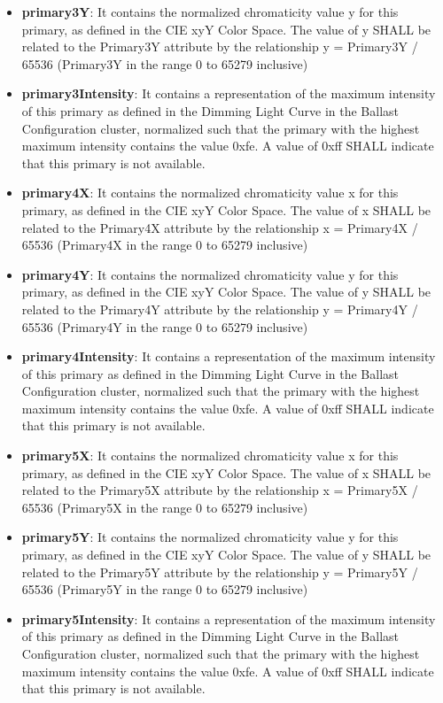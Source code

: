 \begin{itemize}
\item \textbf{primary3Y}: It contains the normalized chromaticity value y for this primary, as defined in the CIE xyY Color Space. The value of y SHALL be related to the Primary3Y attribute by the relationship y = Primary3Y / 65536 (Primary3Y in the range 0 to 65279 inclusive)
\item \textbf{primary3Intensity}: It contains a representation of the maximum intensity of this primary as defined in the Dimming Light Curve in the Ballast Configuration cluster, normalized such that the primary with the highest maximum intensity contains the value 0xfe. A value of 0xff SHALL indicate that this primary is not available.
\item \textbf{primary4X}: It contains the normalized chromaticity value x for this primary, as defined in the CIE xyY Color Space. The value of x SHALL be related to the Primary4X attribute by the relationship x = Primary4X / 65536 (Primary4X in the range 0 to 65279 inclusive)
\item \textbf{primary4Y}: It contains the normalized chromaticity value y for this primary, as defined in the CIE xyY Color Space. The value of y SHALL be related to the Primary4Y attribute by the relationship y = Primary4Y / 65536 (Primary4Y in the range 0 to 65279 inclusive)
\item \textbf{primary4Intensity}: It contains a representation of the maximum intensity of this primary as defined in the Dimming Light Curve in the Ballast Configuration cluster, normalized such that the primary with the highest maximum intensity contains the value 0xfe. A value of 0xff SHALL indicate that this primary is not available.
\item \textbf{primary5X}: It contains the normalized chromaticity value x for this primary, as defined in the CIE xyY Color Space. The value of x SHALL be related to the Primary5X attribute by the relationship x = Primary5X / 65536 (Primary5X in the range 0 to 65279 inclusive)
\item \textbf{primary5Y}: It contains the normalized chromaticity value y for this primary, as defined in the CIE xyY Color Space. The value of y SHALL be related to the Primary5Y attribute by the relationship y = Primary5Y / 65536 (Primary5Y in the range 0 to 65279 inclusive)
\item \textbf{primary5Intensity}: It contains a representation of the maximum intensity of this primary as defined in the Dimming Light Curve in the Ballast Configuration cluster, normalized such that the primary with the highest maximum intensity contains the value 0xfe. A value of 0xff SHALL indicate that this primary is not available.

\end{itemize}
